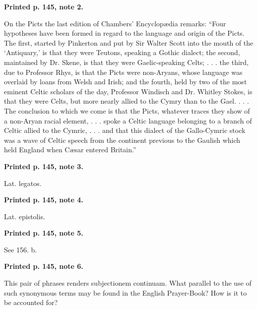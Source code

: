 \textbf{Printed p. 145, note 2.}

On the Picts the last edition of Chambers’ Encyclopædia remarks: “Four hypotheses have been formed in regard to the language and origin of the Picts. The first, started by Pinkerton and put by Sir Walter Scott into the mouth of the ‘Antiquary,’ is that they were Teutons, speaking a Gothic dialect; the second, maintained by Dr. Skene, is that they were Gaelic-speaking Celts; . . . the third, due to Professor Rhys, is that the Picts were non-Aryans, whose language was overlaid by loans from Welsh and Irish; and the fourth, held by two of the most eminent Celtic scholars of the day, Professor Windisch and Dr. Whitley Stokes, is that they were Celts, but more nearly allied to the Cymry than to the Gael. . . . The conclusion to which we come is that the Picts, whatever traces they show of a non-Aryan racial element, . . . spoke a Celtic language belonging to a branch of Celtic allied to the Cymric, . . . and that this dialect of the Gallo-Cymric stock was a wave of Celtic speech from the continent previous to the Gaulish which held England when Cæsar entered Britain.”

\textbf{Printed p. 145, note 3.}

Lat. legatos.

\textbf{Printed p. 145, note 4.}

Lat. epistolis.

\textbf{Printed p. 145, note 5.}

See 156. b.

\textbf{Printed p. 145, note 6.}

This pair of phrases renders subjectionem continuam. What parallel to the use of such synonymous terms may be found in the English Prayer-Book? How is it to be accounted for?

